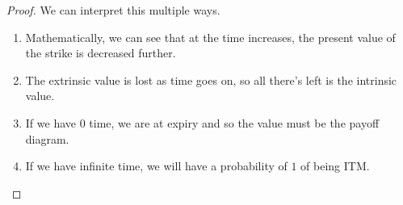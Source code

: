 \documentclass{article}
\begin{document}
    \begin{proof}
      We can interpret this multiple ways. 
      \begin{enumerate}
        \item Mathematically, we can see that at the time increases, the present value of the strike is decreased further. 
        \item The extrinsic value is lost as time goes on, so all there's left is the intrinsic value. 
        \item If we have $0$ time, we are at expiry and so the value must be the payoff diagram. 
        \item If we have infinite time, we will have a probability of $1$ of being ITM. 
      \end{enumerate}
    \end{proof}
\end{document}
